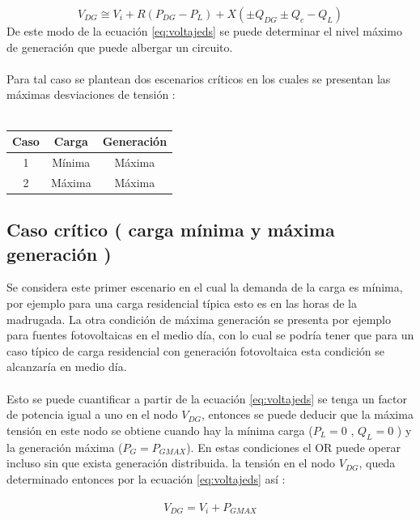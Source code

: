 \documentclass[12pt, letterpaper]{report}
\begin{document}
\begin{equation}
V_{DG} \cong V_{i} + R (P_{DG} - P_{L}) + X(\pm Q_{DG} \pm Q_{c} - Q_{L})
\label{eq:voltajeds}
\end{equation}
De este modo  de la ecuación \ref{eq:voltajeds} se puede determinar  el nivel máximo de generación que puede  albergar un circuito.\\\\
Para tal caso se plantean dos escenarios críticos en los cuales se presentan las máximas desviaciones de tensión \cite{Elkhatib2011a}:\\\\

\begin{tabular}{|c|c|c|}
    \hline 
    Caso 	& Carga 	& Generación \\\hline
    1 		& Mínima	& Máxima \\\hline
    2		& Máxima	& Máxima \\
    \hline
\end{tabular}

\subsection{Caso crítico ( carga mínima  y máxima generación ) }
Se considera este primer escenario en el cual la demanda de la carga es mínima, por ejemplo  para una carga residencial típica  esto es  en las horas de la madrugada. La otra condición de máxima generación se presenta por ejemplo para fuentes fotovoltaicas  en el medio día,  con lo cual se podría tener que para un caso típico de carga residencial con generación fotovoltaica esta condición se alcanzaría en medio día.\\\\
Esto se puede  cuantificar a partir de la ecuación \ref{eq:voltajeds} se tenga un factor de potencia igual a uno  en el nodo  $V_{DG}$, entonces se puede deducir que la máxima tensión en este nodo se obtiene cuando hay la mínima carga ($P_{L} = 0$ , $Q_{L} = 0$ )  y la generación máxima ($P_{G} = P_{GMAX}$). En estas condiciones el OR puede operar incluso sin que exista generación distribuida. la tensión en el nodo $V_{DG}$, queda determinado entonces por la ecuación \ref{eq:voltajeds} así \cite{strbac2002integration} :\\\\
\begin{equation}
V_{DG} = V_{i} + P_{GMAX}
\label{eq:vgmax}
\end{equation}
\end{document}
